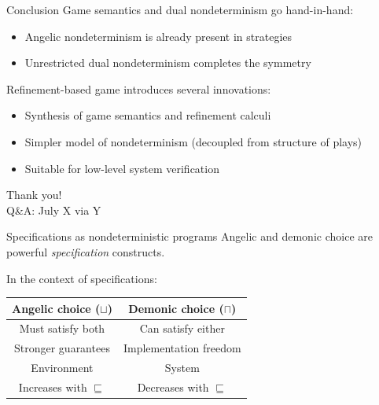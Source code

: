 \documentclass{beamer}
\begin{document}
\begin{frame}{Conclusion}
  Game semantics and dual nondeterminism go hand-in-hand:
  \begin{itemize}
    \item Angelic nondeterminism is already present in strategies
    \item Unrestricted dual nondeterminism completes the symmetry
  \end{itemize}

  Refinement-based game introduces several innovations:
  \begin{itemize}
    \item Synthesis of game semantics and refinement calculi
    \item Simpler model of nondeterminism (decoupled from structure of plays)
    \item Suitable for low-level system verification
  \end{itemize}
\end{frame}


\begin{frame}{}
  \begin{center}
    Thank you!
    \\
    \vspace{3em}
    Q\&A: July X via Y
  \end{center}
\end{frame}


\appendix

\begin{frame}{Specifications as nondeterministic programs} %
  Angelic and demonic choice are powerful
  \emph{specification} constructs.

  \pause
  In the context of specifications:
  \begin{center}
    \begin{tabular}{cc}
      \hline
      Angelic choice ($\sqcup$) & Demonic choice ($\sqcap$) \\
      \hline
      Must satisfy both & Can satisfy either \\
      Stronger guarantees & Implementation freedom \\
      Environment & System \\
      Increases with $\sqsubseteq$ & Decreases with $\sqsubseteq$ \\
      \hline
    \end{tabular}
  \end{center}
\end{frame}
\end{document}
